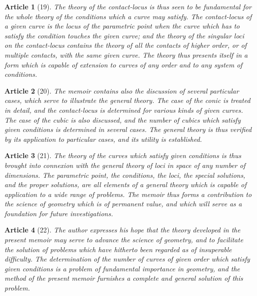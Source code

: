 \documentclass[11pt,a4paper]{article}
\theoremstyle{cayley}
\newtheorem{art}{Article}
\begin{document}
\begin{art}[19]
The theory of the contact-locus is thus seen to be fundamental for the whole theory of the conditions which a curve may satisfy. The contact-locus of a given curve is the locus of the parametric point when the curve which has to satisfy the condition touches the given curve; and the theory of the singular loci on the contact-locus contains the theory of all the contacts of higher order, or of multiple contacts, with the same given curve. The theory thus presents itself in a form which is capable of extension to curves of any order and to any system of conditions.
\end{art}

\begin{art}[20]
The memoir contains also the discussion of several particular cases, which serve to illustrate the general theory. The case of the conic is treated in detail, and the contact-locus is determined for various kinds of given curves. The case of the cubic is also discussed, and the number of cubics which satisfy given conditions is determined in several cases. The general theory is thus verified by its application to particular cases, and its utility is established.
\end{art}

\begin{art}[21]
The theory of the curves which satisfy given conditions is thus brought into connexion with the general theory of loci in space of any number of dimensions. The parametric point, the conditions, the loci, the special solutions, and the proper solutions, are all elements of a general theory which is capable of application to a wide range of problems. The memoir thus forms a contribution to the science of geometry which is of permanent value, and which will serve as a foundation for future investigations.
\end{art}

\begin{art}[22]
The author expresses his hope that the theory developed in the present memoir may serve to advance the science of geometry, and to facilitate the solution of problems which have hitherto been regarded as of insuperable difficulty. The determination of the number of curves of given order which satisfy given conditions is a problem of fundamental importance in geometry, and the method of the present memoir furnishes a complete and general solution of this problem.
\end{art}
\end{document}

